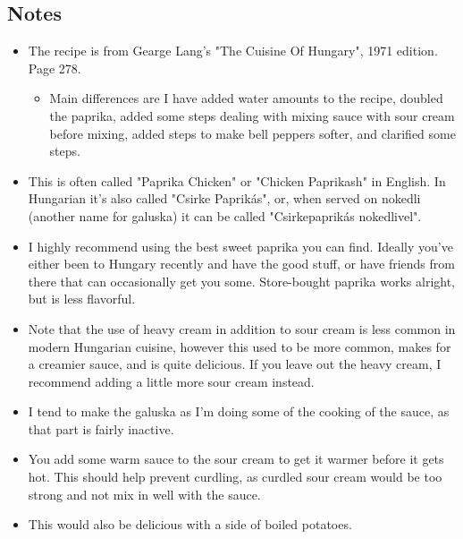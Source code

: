 \begin{multicols}{2}
\subsection*{Notes}
\begin{itemize}
    \item The recipe is from Gearge Lang's "The Cuisine Of Hungary", 1971 edition. Page 278.
    \begin{itemize}
        \item Main differences are I have added water amounts to the recipe, doubled the paprika, added some steps dealing with mixing sauce with sour cream before mixing, added steps to make bell peppers softer, and clarified some steps.
    \end{itemize}
    \item This is often called "Paprika Chicken" or "Chicken Paprikash" in English. In Hungarian it's also called "Csirke Paprikás", or, when served on nokedli (another name for galuska) it can be called "Csirkepaprikás nokedlivel".
    \item I highly recommend using the best sweet paprika you can find. Ideally you've either been to Hungary recently and have the good stuff, or have friends from there that can occasionally get you some. Store-bought paprika works alright, but is less flavorful.
    \item Note that the use of heavy cream in addition to sour cream is less common in modern Hungarian cuisine, however this used to be more common, makes for a creamier sauce, and is quite delicious. If you leave out the heavy cream, I recommend adding a little more sour cream instead.
    \item I tend to make the galuska as I'm doing some of the cooking of the sauce, as that part is fairly inactive.
    \item You add some warm sauce to the sour cream to get it warmer before it gets hot. This should help prevent curdling, as curdled sour cream would be too strong and not mix in well with the sauce.
    \item This would also be delicious with a side of boiled potatoes.
\end{itemize}
\end{multicols}
\clearpage